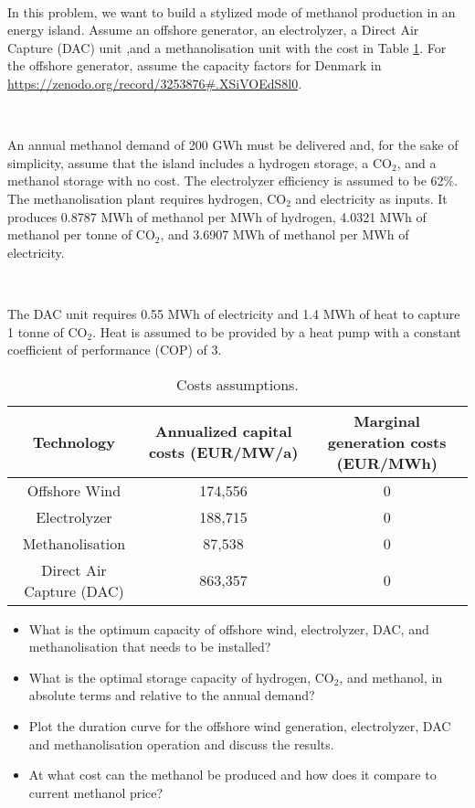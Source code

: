 \documentclass[10pt]{article}
\newenvironment{problem}[2][Problem]{\begin{trivlist}
\item[\hskip \labelsep {\bfseries #1}\hskip \labelsep {\bfseries #2.}]}{\end{trivlist}}
\begin{document}
\

\begin{problem}{12.2}

In this problem, we want to build a stylized mode of methanol production in an energy island. Assume an offshore generator, an electrolyzer, a Direct Air Capture (DAC) unit ,and a methanolisation unit with the cost in Table \ref{tab_cost}. For the offshore generator, assume the capacity factors for Denmark in \url{https://zenodo.org/record/3253876#.XSiVOEdS8l0}.

\

An annual methanol demand of 200 GWh must be delivered and, for the sake of simplicity, assume that the island includes a hydrogen storage, a CO$_2$, and a methanol storage with no cost. The electrolyzer efficiency is assumed to be 62\%. The methanolisation plant requires hydrogen, CO$_2$ and electricity as inputs. It produces 0.8787 MWh of methanol per MWh of hydrogen, 4.0321 MWh of methanol per tonne of CO$_2$, and 3.6907 MWh of methanol per MWh of electricity. 

\

The DAC unit requires  0.55 MWh of electricity and 1.4 MWh of heat to capture 1 tonne of CO$_2$. Heat is assumed to be provided by a heat pump with a constant coefficient of performance (COP) of 3.



\begin{table}[h]
    \centering
    \begin{tabular}{ccc}
    \hline
        Technology & Annualized capital costs (EUR/MW/a) & Marginal generation costs (EUR/MWh) \\
    \hline
    Offshore Wind &  174,556 & 0 \\
    Electrolyzer & 188,715 & 0 \\
    Methanolisation & 87,538 & 0 \\
    Direct Air Capture (DAC) & 863,357 & 0 \\
    \hline
    \end{tabular}
    \caption{Costs assumptions.}
    \label{tab_cost}
\end{table}

\begin{itemize}
\item[a)] What is the optimum capacity of offshore wind, electrolyzer, DAC, and methanolisation that needs to be installed?
\item[b)] What is the optimal storage capacity of hydrogen, CO$_2$, and methanol, in absolute terms and relative to the annual demand?
\item[c)] Plot the duration curve for the offshore wind generation, electrolyzer, DAC and methanolisation operation and discuss the results.
\item[d)] At what cost can the methanol be produced and how does it compare to current methanol price?

\end{itemize}


\end{problem}



\end{document}
